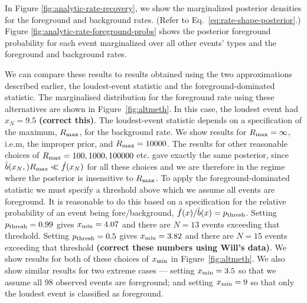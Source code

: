 \documentclass[aps,prd]{revtex4-1}
\newcommand{\jon}[1]{{\color{green} \bf  #1}}
\begin{document}
In Figure \ref{fig:analytic-rate-recovery}, we show the marginalized
posterior densities for the foreground and background rates.  (Refer
to Eq.~\eqref{eq:rate-shape-posterior}.)  Figure
\ref{fig:analytic-rate-foreground-probs} shows the posterior
foreground probability for each event marginalized over all other
events' types and the foreground and background rates.

We can compare these results to results obtained using the two approximations described earlier, the loudest-event statistic and the foreground-dominated statistic. The marginalised distribution for the foreground rate using these alternatives are shown in Figure~\ref{fig:altmeth}. In this case, the loudest event had $x_N=9.5$\jon{(correct this)}. The loudest-event statistic depends on a specification of the maximum, $R_{\rm max}$, for the background rate. We show results for $R_{\rm max}=\infty$, i.e.m, the improper prior, and $R_{\rm max}=10000$. The results for other reasonable  choices of $R_{\rm max} = 100, 1000, 100000$ etc. gave exactly the same posterior, since $\hat{b}(x_N,) R_{\rm max} \ll \hat{f}(x_N)$ for all these choices and we are therefore in the regime where the posterior is insensitive to $R_{\rm max}$. To apply the foreground-dominated statistic we must specify a threshold above which we assume all events are foreground. It is reasonable to do this based on a specification for the relative probability of an event being fore/background, $\hat{f}(x)/\hat{b}(x)=p_{\rm thresh}$. Setting $p_{\rm thresh}=0.99$ gives $x_{\rm min}=4.07$ and there are $N=13$ events exceeding that threshold. Setting $p_{\rm thresh}=0.5$ gives $x_{\rm min}=3.82$ and there are $N=15$ events exceeding that threshold \jon{(correct these numbers using Will's data)}. We show results for both of these choices of $x_{\rm min}$ in Figure~\ref{fig:altmeth}. We also show similar results for two extreme cases --- setting $x_{\rm min}=3.5$ so that we assume all $98$ observed events are foreground; and setting $x_{\rm min}=9$ so that only the loudest event is classified as foreground.
\end{document}
